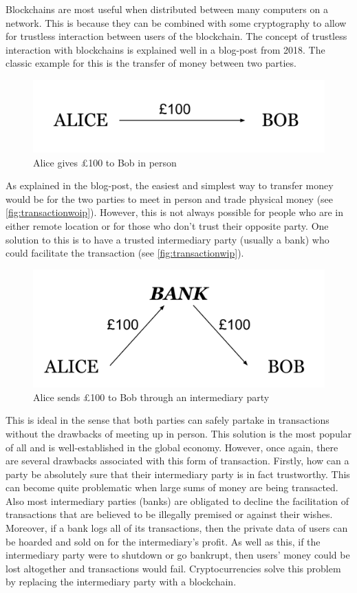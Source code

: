 \documentclass{article}
\begin{document}
Blockchains are most useful when distributed between many computers on a network. This is because they can be combined with some cryptography to allow for trustless interaction between users of the blockchain. The concept of trustless interaction with blockchains is explained well in a blog-post from 2018\cite{medium_trustless_blockchain}. The classic example for this is the transfer of money between two parties. 
\begin{figure}[h]
    \centering
    \includegraphics[width=0.65\linewidth]{Images/Diagrams/transaction_in_person.png}
    \caption{Alice gives £100 to Bob in person}
    \label{fig:transactionwoip}
\end{figure}
As explained in the blog-post, the easiest and simplest way to transfer money would be for the two parties to meet in person and trade physical money (see \autoref{fig:transactionwoip}). However, this is not always possible for people who are in either remote location or for those who don't trust their opposite party. One solution to this is to have a trusted intermediary party (usually a bank) who could facilitate the transaction (see \autoref{fig:transactionwip}). 
\begin{figure}[h]
    \centering
    \includegraphics[width=0.65\linewidth]{Images/Diagrams/transaction_with_intermediary.png}
    \caption{Alice sends £100 to Bob through an intermediary party}
    \label{fig:transactionwip}
\end{figure}
This is ideal in the sense that both parties can safely partake in transactions without the drawbacks of meeting up in person. This solution is the most popular of all and is well-established in the global economy. However, once again, there are several drawbacks associated with this form of transaction. Firstly, how can a party be absolutely sure that their intermediary party is in fact trustworthy. This can become quite problematic when large sums of money are being transacted. Also most intermediary parties (banks) are obligated to decline the facilitation of transactions that are believed to be illegally premised or against their wishes. Moreover, if a bank logs all of its transactions, then the private data of users can be hoarded and sold on for the intermediary's profit. As well as this, if the intermediary party were to shutdown or go bankrupt, then users' money could be lost altogether and transactions would fail. Cryptocurrencies solve this problem by replacing the intermediary party with a blockchain.
\end{document}
